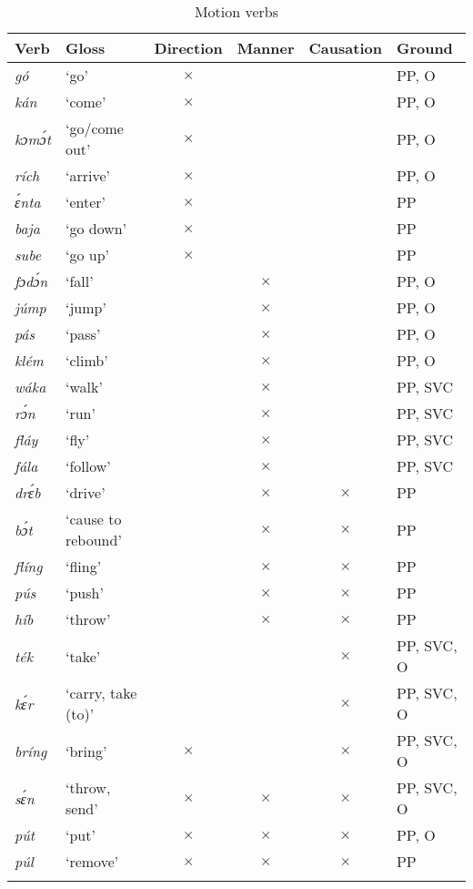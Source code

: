 \begin{table}
\caption{Motion verbs}
\label{tab:key:8.5}
\begin{tabularx}{\textwidth}{lX ccc l}
\lsptoprule
Verb & Gloss & Direction & Manner & Causation & Ground\\
\midrule 
\itshape gó & ‘go’ & $\times$ &  &  & PP, O\\
\itshape kán & ‘come’ & $\times$ &  &  & PP, O\\
\itshape kɔmɔ́t & ‘go/come out’ & $\times$ &  &  & PP, O\\
\itshape rích & ‘arrive’ & $\times$ &  &  & PP, O\\
\itshape ɛ́nta & ‘enter’ & $\times$ &  &  & PP\\
\itshape baja & ‘go down’ & $\times$ &  &  & PP\\
\itshape sube & ‘go up’ & $\times$ &  &  & PP\\
\itshape fɔdɔ́n & ‘fall’ &  & $\times$ &  & PP, O\\
\itshape júmp & ‘jump’ &  & $\times$ &  & PP, O\\
\itshape pás & ‘pass’ &  & $\times$ &  & PP, O\\
\itshape klém & ‘climb’ &  & $\times$ &  & PP, O\\
\itshape wáka & ‘walk’ &  & $\times$ &  & PP, SVC\\
\itshape rɔ́n & ‘run’ &  & $\times$ &  & PP, SVC\\
\itshape fláy & ‘fly’ &  & $\times$ &  & PP, SVC\\
\itshape fála & ‘follow’ &  & $\times$ &  & PP, SVC\\
\itshape drɛ́b & ‘drive’ &  & $\times$ & $\times$ & PP\\
\itshape bɔ́t & ‘cause to rebound’ &  & $\times$ & $\times$ & PP\\
\itshape flíng & ‘fling’ &  & $\times$ & $\times$ & PP\\
\itshape pús & ‘push’ &  & $\times$ & $\times$ & PP\\
\itshape híb & ‘throw’ &  & $\times$ & $\times$ & PP\\
\itshape ték & ‘take’ &  &  & $\times$ & PP, SVC, O\\
\itshape kɛ́r & ‘carry, take (to)’ &  &  & $\times$ & PP, SVC, O\\
\itshape bríng & ‘bring’ & $\times$ &  & $\times$ & PP, SVC, O\\
\itshape sɛ́n & ‘throw, send’ & $\times$ & $\times$ & $\times$ & PP, SVC, O\\
\itshape pút & ‘put’ & $\times$ & $\times$ & $\times$ & PP, O\\
\itshape púl & ‘remove’ & $\times$ & $\times$ & $\times$ & PP\\
\lspbottomrule
\end{tabularx}
\end{table}


